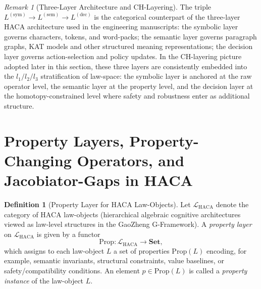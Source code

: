 \documentclass[11pt]{book}
\theoremstyle{plain}
\theoremstyle{definition}
\newtheorem{definition}[theorem]{Definition}
\theoremstyle{remark}
\newtheorem{remark}[theorem]{Remark}
\begin{document}
\begin{remark}[Three-Layer Architecture and CH-Layering]
\label{rem:haca-three-layer-vs-ch-layer}
The triple
$L^{(\mathrm{sym})}\to L^{(\mathrm{sem})}\to L^{(\mathrm{dec})}$ is the
categorical counterpart of the three-layer HACA architecture used in the
engineering manuscripts: the symbolic layer governs characters,
tokens, and word-packs; the semantic layer governs paragraph graphs,
KAT models and other structured meaning representations; the decision
layer governs action-selection and policy updates. In the CH-layering
picture adopted later in this section, these three layers are
consistently embedded into the $l_1/l_2/l_3$ stratification of
law-space: the symbolic layer is anchored at the raw operator level,
the semantic layer at the property level, and the decision layer at the
homotopy-constrained level where safety and robustness enter as
additional structure.
\end{remark}



\section[Property Layers, Property-Changing Operators, and Jacobiator-Gaps in HACA]{Property Layers, Property-Changing Operators, and \\Jacobiator-Gaps in HACA}


\begin{definition}[Property Layer for HACA Law-Objects]
\label{def:haca-property-layer}
Let $\mathcal{L}_{\mathrm{HACA}}$ denote the category of HACA law-objects
(hierarchical algebraic cognitive architectures viewed as law-level
structures in the GaoZheng G-Framework). A \emph{property layer} on
$\mathcal{L}_{\mathrm{HACA}}$ is given by a functor
\[
  \mathrm{Prop} : \mathcal{L}_{\mathrm{HACA}} \longrightarrow \mathbf{Set},
\]
which assigns to each law-object $L$ a set of properties
$\mathrm{Prop}(L)$ encoding, for example, semantic invariants, structural
constraints, value baselines, or safety/compatibility conditions.  An
element $p \in \mathrm{Prop}(L)$ is called a \emph{property instance} of
the law-object $L$.
\end{definition}
\end{document}
